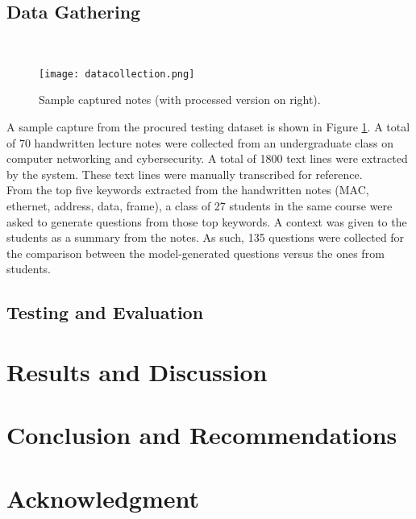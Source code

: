 \documentclass[conference]{IEEEtran}
\begin{document}
    \subsection{Data Gathering}
        \hfill \\
        \vspace{-1cm}
        \begin{figure}[H]
            \centerline{\texttt{[image: datacollection.png]}}
            \vspace{-0.3cm}
            \caption{Sample captured notes (with processed version on right).} 
            \label{datacollection}
        \end{figure} 
        \vspace{-0.3cm} 
        \indent A sample capture from the procured testing dataset 
        is shown in Figure \ref{datacollection}. 
        A total of 70 handwritten lecture notes were collected
        from an undergraduate class on computer networking and 
        cybersecurity. A total of 1800 text lines were extracted by the 
        system. These text lines were manually transcribed for reference.
        \\
        \indent From the top five keywords extracted from the handwritten notes
        (MAC, ethernet, address, data, frame), 
        a class of 27 students in the same course 
        were asked to generate questions from those top keywords. A 
        context was given to the students as a summary from the 
        notes. As such, 135 questions were collected for the comparison 
        between the model-generated questions versus the ones 
        from students.

    \subsection{Testing and Evaluation}

\section{Results and Discussion}
\section{Conclusion and Recommendations}

\section*{Acknowledgment}
\end{document}
